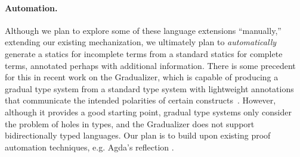 \paragraph{Automation.} Although we plan to
    explore some of these language extensions 
    ``manually,'' extending our existing mechanization, we ultimately plan 
    to \emph{automatically}
    generate a statics for incomplete terms from a standard statics for complete terms,
    annotated perhaps with additional information. There is some precedent for
    this in recent work on the Gradualizer, which is capable of
    producing a gradual type system from a standard type system with lightweight
    annotations that communicate the intended polarities of certain
    constructs~\citep{DBLP:conf/popl/CiminiS16}. However, although it provides a good starting point, gradual type systems 
    only consider the problem of holes in 
    types, and the Gradualizer does not support bidirectionally typed languages.
    Our plan is to build 
    upon existing proof automation techniques, e.g. Agda's reflection \citep{van2012engineering}.

